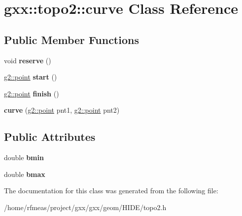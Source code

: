 \hypertarget{classgxx_1_1topo2_1_1curve}{}\section{gxx\+:\+:topo2\+:\+:curve Class Reference}
\label{classgxx_1_1topo2_1_1curve}
\subsection*{Public Member Functions}
\begin{DoxyCompactItemize}
\item 
void {\bfseries reserve} ()\hypertarget{classgxx_1_1topo2_1_1curve_ac8874c22cfbd9dc2585fb74d4bed7aaa}{}\label{classgxx_1_1topo2_1_1curve_ac8874c22cfbd9dc2585fb74d4bed7aaa}

\item 
\hyperlink{classmalgo_1_1vector2}{g2\+::point} {\bfseries start} ()\hypertarget{classgxx_1_1topo2_1_1curve_a8940d5a74bd568e3ef06dbbbdafe5502}{}\label{classgxx_1_1topo2_1_1curve_a8940d5a74bd568e3ef06dbbbdafe5502}

\item 
\hyperlink{classmalgo_1_1vector2}{g2\+::point} {\bfseries finish} ()\hypertarget{classgxx_1_1topo2_1_1curve_a0dd1586f5fe1ce3d92a8e5092d38f38d}{}\label{classgxx_1_1topo2_1_1curve_a0dd1586f5fe1ce3d92a8e5092d38f38d}

\item 
{\bfseries curve} (\hyperlink{classmalgo_1_1vector2}{g2\+::point} pnt1, \hyperlink{classmalgo_1_1vector2}{g2\+::point} pnt2)\hypertarget{classgxx_1_1topo2_1_1curve_a644b33558b85aebbc8a03d1180da7cf3}{}\label{classgxx_1_1topo2_1_1curve_a644b33558b85aebbc8a03d1180da7cf3}

\end{DoxyCompactItemize}
\subsection*{Public Attributes}
\begin{DoxyCompactItemize}
\item 
double {\bfseries bmin}\hypertarget{classgxx_1_1topo2_1_1curve_a7e5a2c4217df1f54ae490b22a9fd159b}{}\label{classgxx_1_1topo2_1_1curve_a7e5a2c4217df1f54ae490b22a9fd159b}

\item 
double {\bfseries bmax}\hypertarget{classgxx_1_1topo2_1_1curve_a5e7aefdadc57819ece97c8ce22bca3d4}{}\label{classgxx_1_1topo2_1_1curve_a5e7aefdadc57819ece97c8ce22bca3d4}

\end{DoxyCompactItemize}


The documentation for this class was generated from the following file\+:\begin{DoxyCompactItemize}
\item 
/home/rfmeas/project/gxx/gxx/geom/\+H\+I\+D\+E/topo2.\+h\end{DoxyCompactItemize}
